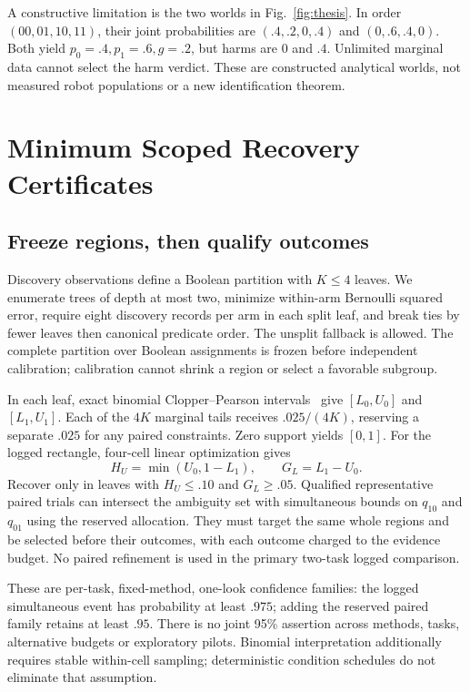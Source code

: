 \documentclass[conference]{IEEEtran}
\begin{document}
A constructive limitation is the two worlds in Fig.~\ref{fig:thesis}. In order $(00,01,10,11)$, their joint probabilities are $(.4,.2,0,.4)$ and $(0,.6,.4,0)$. Both yield $p_0=.4,p_1=.6,g=.2$, but harms are $0$ and $.4$. Unlimited marginal data cannot select the harm verdict. These are constructed analytical worlds, not measured robot populations or a new identification theorem.

\section{Minimum Scoped Recovery Certificates}
\subsection{Freeze regions, then qualify outcomes}
Discovery observations define a Boolean partition with $K\leq4$ leaves. We enumerate trees of depth at most two, minimize within-arm Bernoulli squared error, require eight discovery records per arm in each split leaf, and break ties by fewer leaves then canonical predicate order. The unsplit fallback is allowed. The complete partition over Boolean assignments is frozen before independent calibration; calibration cannot shrink a region or select a favorable subgroup.

In each leaf, exact binomial Clopper--Pearson intervals~\cite{clopper1934} give $[L_0,U_0]$ and $[L_1,U_1]$. Each of the $4K$ marginal tails receives $.025/(4K)$, reserving a separate $.025$ for any paired constraints. Zero support yields $[0,1]$. For the logged rectangle, four-cell linear optimization gives
\begin{equation}
 H_U=\min(U_0,1-L_1),\qquad G_L=L_1-U_0.\label{eq:finite}
\end{equation}
Recover only in leaves with $H_U\leq .10$ and $G_L\geq .05$. Qualified representative paired trials can intersect the ambiguity set with simultaneous bounds on $q_{10}$ and $q_{01}$ using the reserved allocation. They must target the same whole regions and be selected before their outcomes, with each outcome charged to the evidence budget. No paired refinement is used in the primary two-task logged comparison.

These are per-task, fixed-method, one-look confidence families: the logged simultaneous event has probability at least $.975$; adding the reserved paired family retains at least $.95$. There is no joint 95\% assertion across methods, tasks, alternative budgets or exploratory pilots. Binomial interpretation additionally requires stable within-cell sampling; deterministic condition schedules do not eliminate that assumption.
\end{document}
